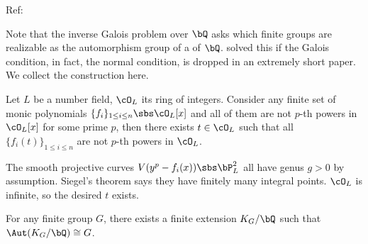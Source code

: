 \documentclass[0-main]{subfiles}
\begin{document}
Ref:~\cite{FK1978}

Note that the inverse Galois problem over $\bQ$ asks which finite groups are realizable as the automorphism group of a  of $\bQ$.  solved this if the Galois condition, in fact, the normal condition, is dropped in an extremely short paper\cite{FK1978}. We collect the construction here.


\begin{lem}\label{FK1978:Lem2}
	Let $L$ be a number field, $\cO_{L}$ its ring of integers. Consider any finite set of monic polynomials $\{f_{i}\}_{1\leq i\leq n}\sbs\cO_{L}[x]$ and all of them are not $p$-th powers in $\cO_{L}[x]$ for some prime $p$, then there exists $t\in \cO_{L}$ such that all $\{f_{i}(t)\}_{1\leq i\leq n}$ are not $p$-th powers in $\cO_{L}$.
\end{lem}

\begin{prf}
	The smooth projective curves $V(y^{p}-f_{i}(x))\sbs\bP_{L}^{2}$ all have genus $g>0$ by assumption. Siegel's theorem says they have finitely many integral points. $\cO_{L}$ is infinite, so the desired $t$ exists.
\end{prf}

\begin{thm}
	For any finite group $G$, there exists a finite extension $K_{G}/\bQ$ such that $\Aut(K_{G}/\bQ)\cong G$.
\end{thm}
\end{document}
